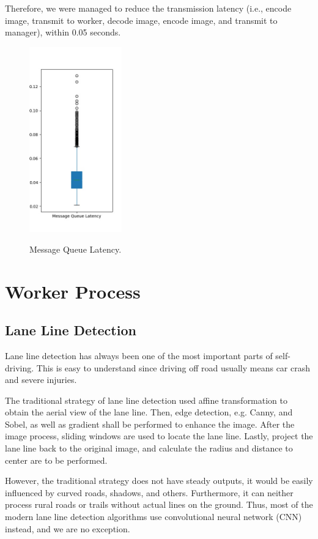 \documentclass[runningheads]{llncs}
\begin{document}
Therefore, we were managed to reduce the transmission 
latency (i.e., encode image, transmit to worker, decode 
image, encode image, and transmit to manager), within 0.05 
seconds.

\begin{figure}
    \centering
    \includegraphics[height=8cm]{reference/latency}
    \label{fig:MQLatency}
    \caption{Message Queue Latency.}
\end{figure}


\section{Worker Process}

\subsection{Lane Line Detection}
Lane line detection has always been one of the most 
important parts of self-driving. This is easy to understand 
since driving off road usually means car crash and severe 
injuries. 

The traditional strategy of lane line detection used affine 
transformation to obtain the aerial view of the lane line. 
Then, edge detection, e.g. Canny, and Sobel, as well as 
gradient shall be performed to enhance the image. After the 
image process, sliding windows are used to locate the lane 
line. Lastly, project the lane line back to the original 
image, and calculate the radius and distance to center are 
to be performed. 

However, the traditional strategy does not have steady 
outputs, it would be easily influenced by curved roads, 
shadows, and others. Furthermore, it can neither process 
rural roads or trails without actual lines on the ground. 
Thus, most of the modern lane line detection algorithms 
use convolutional neural network (CNN) instead, and we 
are no exception. 
\end{document}
